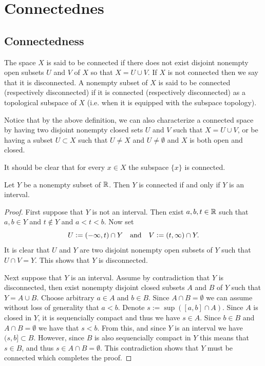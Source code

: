 \documentclass[11pt,a4paper]{article}
\begin{document}
\newpage

\section{Connectednes}

\subsection{Connectedness}

\begin{definition}[Connectedness]
  The space $X$ is said to be connected if there does not exist disjoint
  nonempty open subsets $U$ and $V$ of $X$ so that $X = U \cup V$.
  If $X$ is not connected then we say that it is disconnected.
  A nonempty subset of $X$ is said to be connected 
  (respectively disconnected) if it is connected (respectively disconnected) 
  as a topological subspace of $X$
  (i.e. when it is equipped with the subspace topology).
\end{definition}

Notice that by the above definition, we can also characterize a connected
space by having two disjoint nonempty closed sets $U$ and $V$ such that
$X = U \cup V$, or be having a subset $U \subset X$ such that $U \neq X$
and $U \neq \emptyset$ and $X$ is both open and closed.

\begin{remark}
  It should be clear that for every $x \in X$ the subspace $\{x\}$ is
  connected.
\end{remark}

\begin{proposition}\label{prp:R-connected-interval}
  Let $Y$ be a nonempty subset of $\mathbb{R}$.
  Then $Y$ is connected if and only if $Y$ is an interval.
\end{proposition}
\begin{proof}
  First suppose that $Y$ is not an interval. Then exist $a,b,t \in \mathbb{R}$
  such that $a,b \in Y$ and $t \notin Y$ and $a < t < b$.
  Now set
  \[
    U := (-\infty,t) \cap Y \quad \text{and} \quad V := (t,\infty) \cap Y.
  \]
  It is clear that $U$ and $Y$ are two disjoint nonempty open subsets of $Y$
  such that $U \cap V = Y$. This shows that $Y$ is disconnected.

  Next suppose that $Y$ is an interval.
  Assume by contradiction that $Y$ is disconnected, then exist nonempty
  disjoint closed subsets $A$ and $B$ of $Y$ such that $Y = A \cup B$.
  Choose arbitrary $a \in A$ and $b \in B$.
  Since $A \cap B = \emptyset$ we can assume without loss of generality
  that $a < b$. Denote $s := \sup([a,b] \cap A)$.
  Since $A$ is closed in $Y$, it is sequencially compact and thus we have 
  $s \in A$.
  Since $b \in B$ and $A \cap B = \emptyset$ we have that $s < b$.
  From this, and since $Y$ is an interval we have $(s,b] \subset B$.
  However, since $B$ is also sequencially compact in $Y$ this means
  that $s \in B$, and thus $s \in A \cap B = \emptyset$.
  This contradiction shows that $Y$ must be connected
  which completes the proof.
\end{proof}
\end{document}
